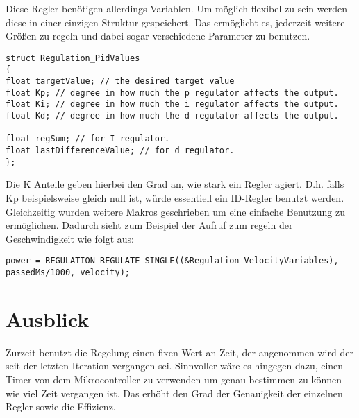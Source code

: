 Diese Regler benötigen allerdings Variablen. Um möglich flexibel zu sein werden diese in einer einzigen Struktur gespeichert. Das ermöglicht es, jederzeit weitere Größen zu regeln und dabei sogar verschiedene Parameter zu benutzen.

\begin{lstlisting}[frame=single, caption=Interne Abstrahierung des Sensorik Interface, label=lst:protoEx]
struct Regulation_PidValues
{
float targetValue; // the desired target value
float Kp; // degree in how much the p regulator affects the output.
float Ki; // degree in how much the i regulator affects the output.
float Kd; // degree in how much the d regulator affects the output.

float regSum; // for I regulator.
float lastDifferenceValue; // for d regulator.
};
\end{lstlisting}
Die K Anteile geben hierbei den Grad an, wie stark ein Regler agiert. D.h. falls Kp beispielsweise gleich null ist, würde essentiell ein ID-Regler benutzt werden.\\
Gleichzeitig wurden weitere Makros geschrieben um eine einfache Benutzung zu ermöglichen. Dadurch sieht zum Beispiel der Aufruf zum regeln der Geschwindigkeit wie folgt aus:\\
\begin{lstlisting}[frame=single, caption=Interne Abstrahierung des Sensorik Interface, label=lst:protoEx]
power = REGULATION_REGULATE_SINGLE((&Regulation_VelocityVariables), passedMs/1000, velocity);
\end{lstlisting}
\section{Ausblick}
Zurzeit benutzt die Regelung einen fixen Wert an Zeit, der angenommen wird der seit der letzten Iteration vergangen sei. Sinnvoller wäre es hingegen dazu, einen Timer von dem Mikrocontroller zu verwenden um genau bestimmen zu können wie viel Zeit vergangen ist. Das erhöht den Grad der Genauigkeit der einzelnen Regler sowie die Effizienz.
